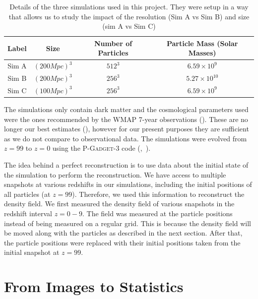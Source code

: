 \begin{table}[h!]
    \centering
    \begin{tabular}{ |c|c|c|c| } 
        \hline
        Label & Size & Number of Particles & Particle Mass (Solar Masses) \\
        \hline
        Sim A & $(200 Mpc)^3$ & $512^3$ & $6.59 \times 10^9$ \\ 
        \hline
        Sim B & $(200 Mpc)^3$ & $256^3$ & $5.27 \times 10^{10}$ \\ 
        \hline
        Sim C & $(100 Mpc)^3$ & $256^3$ & $6.59 \times 10^9$ \\ 
        \hline
        
    \end{tabular}
    \caption{Details of the three simulations used in this project. They were setup in a way that allows us to study the impact of the resolution (Sim A vs Sim B) and size (sim A vs Sim C)}
    \label{table:1}
\end{table}

The simulations only contain dark matter and the cosmological parameters used were the ones recommended by the WMAP 7-year observations (\cite{2011ApJS..192...18K}). These are no longer our best estimates (\cite{2016A&A...594A..13P}), however for our present purposes they are sufficient as we do not compare to observational data. The simulations were evolved from $z=99$ to $z=0$ using the \textsc{P-Gadget-3} code (\cite{2005MNRAS.364.1105S},~\cite{2008MNRAS.391.1685S}). 

The idea behind a perfect reconstruction is to use data about the initial state of the simulation to perform the reconstruction. We have access to multiple snapshots at various redshifts in our simulations, including the initial positions of all particles (at $z = 99$). Therefore, we used this information to reconstruct the density field. We first measured the density field of various snapshots in the redshift interval $z = 0 - 9$. The field was measured at the particle positions instead of being measured on a regular grid. This is because the density field will be moved along with the particles as described in the next section. After that, the particle positions were replaced with their initial positions taken from the initial snapshot at $z = 99$.


\section{From Images to Statistics}

